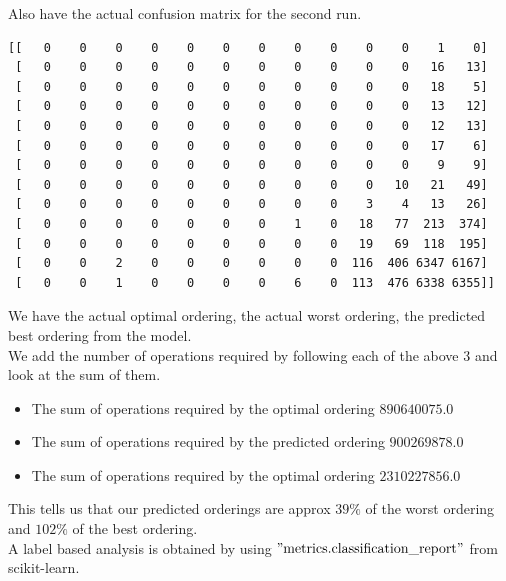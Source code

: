 Also have the actual confusion matrix for the second run.\\
\begin{lstlisting}[caption=Confusion matrix for DQN classificaiton]
[[   0    0    0    0    0    0    0    0    0    0    0    1    0]
 [   0    0    0    0    0    0    0    0    0    0    0   16   13]
 [   0    0    0    0    0    0    0    0    0    0    0   18    5]
 [   0    0    0    0    0    0    0    0    0    0    0   13   12]
 [   0    0    0    0    0    0    0    0    0    0    0   12   13]
 [   0    0    0    0    0    0    0    0    0    0    0   17    6]
 [   0    0    0    0    0    0    0    0    0    0    0    9    9]
 [   0    0    0    0    0    0    0    0    0    0   10   21   49]
 [   0    0    0    0    0    0    0    0    0    3    4   13   26]
 [   0    0    0    0    0    0    0    1    0   18   77  213  374]
 [   0    0    0    0    0    0    0    0    0   19   69  118  195]
 [   0    0    2    0    0    0    0    0    0  116  406 6347 6167]
 [   0    0    1    0    0    0    0    6    0  113  476 6338 6355]]
\end{lstlisting}
We have the actual optimal ordering, the actual worst ordering, the predicted best ordering from the model.\\
We add the number of operations required by following each of the above $3$ and look at the sum of them.\\
\begin{itemize}
    \item The sum of operations required by the optimal ordering $890640075.0$
    \item The sum of operations required by the predicted ordering $900269878.0$
    \item The sum of operations required by the optimal ordering $2310227856.0$
\end{itemize}
This tells us that our predicted orderings are approx $39\%$ of the worst ordering and $102\%$ of the best ordering.\\
A label based analysis is obtained by using $"\text{metrics.classification\_report}"$ from \\
 scikit-learn\cite{scikit-learn}.\\
